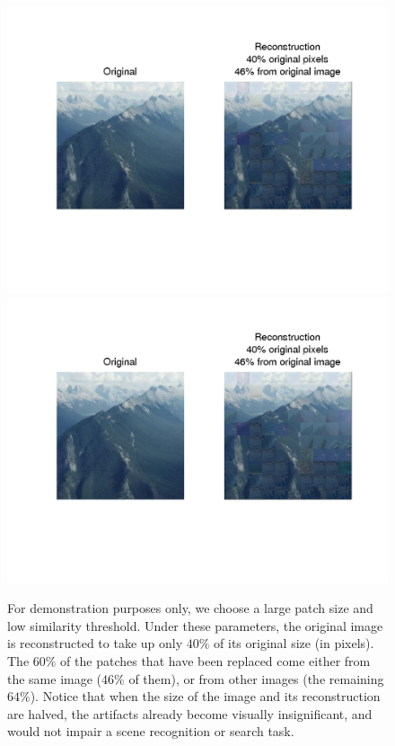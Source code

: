  \begin{figure}
\centering
\includegraphics[width=1\linewidth]{Figures/184.png}
\includegraphics[width=0.5\linewidth]{Figures/184.png}
\caption{For demonstration purposes only, we choose a large patch size and low similarity threshold. Under these parameters, the original image is reconstructed to take up only $40\%$ of its original size (in pixels). The $60\%$ of the patches that have been replaced come either from the same image ($46\%$ of them), or from other images (the remaining $64\%$). Notice that when the size of the image and its reconstruction are halved, the artifacts already become visually insignificant, and would not impair a scene recognition or search task. }
\label{fig:badrecon}
\end{figure}



